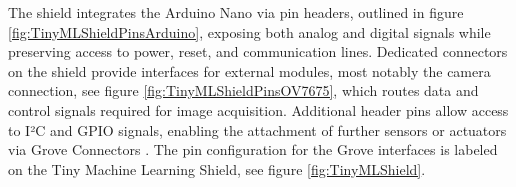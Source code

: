 The shield integrates the Arduino Nano via pin headers, outlined in figure \ref{fig:TinyMLShieldPinsArduino}, exposing both analog and digital signals while preserving access to power, reset, and communication lines. Dedicated connectors on the shield provide interfaces for external modules, most notably the camera connection, see figure \ref{fig:TinyMLShieldPinsOV7675}, which routes data and control signals required for image acquisition. Additional header pins allow access to I²C and GPIO signals, enabling the attachment of further sensors or actuators via Grove Connectors \cite{Arduino:2021b}. The pin configuration for the Grove interfaces is labeled on the Tiny Machine Learning Shield, see figure \ref{fig:TinyMLShield}.



\begin{center}
	
\end{center}

